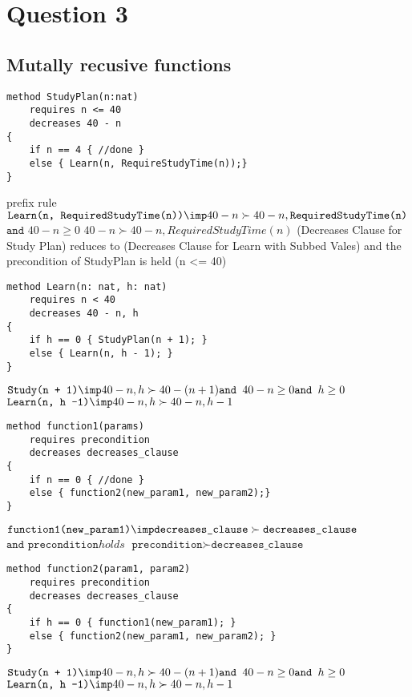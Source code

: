 \section{Question 3}

\subsection{Mutally recusive functions}

\begin{verbatim}
method StudyPlan(n:nat)
    requires n <= 40
    decreases 40 - n
{
    if n == 4 { //done }
    else { Learn(n, RequireStudyTime(n));}
}
\end{verbatim}
prefix rule
$\texttt{Learn(n, RequiredStudyTime(n))} \imp 40 - n \succ 40-n, \texttt{RequiredStudyTime(n)}$
$\texttt{and }  40-n \geq 0$
$40 - n \succ 40 - n, RequiredStudyTime(n)$
\newline
\newline
(Decreases Clause for Study Plan) reduces to (Decreases Clause for Learn with Subbed Vales) and the precondition of StudyPlan is held (n <= 40)

\begin{verbatim}
method Learn(n: nat, h: nat) 
    requires n < 40
    decreases 40 - n, h
{
    if h == 0 { StudyPlan(n + 1); }
    else { Learn(n, h - 1); }
}
\end{verbatim}

$\texttt{Study(n + 1)} \imp 40 - n, h \succ 40-(n+1) \texttt{and } 40 - n \geq 0 \texttt{and } h \geq 0$
$\texttt{Learn(n, h -1)} \imp 40 -n, h \succ 40 -n, h -1$

\begin{verbatim}
method function1(params)
    requires precondition
    decreases decreases_clause
{
    if n == 0 { //done }
    else { function2(new_param1, new_param2);}
}
\end{verbatim}

$\texttt{function1(new\_param1)} \imp \texttt{decreases\_clause} \succ \texttt{decreases\_clause}$
$\texttt{and }  \texttt{precondition} holds$
$\texttt{precondition} \succ \texttt{decreases\_clause}$

\begin{verbatim}
method function2(param1, param2) 
    requires precondition
    decreases decreases_clause
{
    if h == 0 { function1(new_param1); }
    else { function2(new_param1, new_param2); }
}
\end{verbatim}

$\texttt{Study(n + 1)} \imp 40 - n, h \succ 40-(n+1) \texttt{and } 40 - n \geq 0 \texttt{and } h \geq 0$
$\texttt{Learn(n, h -1)} \imp 40 -n, h \succ 40 -n, h -1$